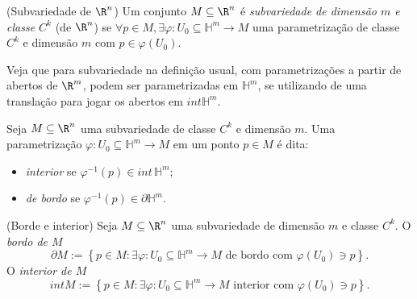 \begin{definition}
    (Subvariedade de $\R^{n}$) Um conjunto $M\subseteq\R^{n}$ é \emph{subvariedade de dimensão $m$ e classe $C^{k}$} (de $\R^{n}$) se $\forall p\in M, \exists \varphi : U_0\subseteq\mathbb{H}^{m} \longrightarrow M$ uma parametrização de classe $C^{k}$ e dimensão $m$ com $p\in \varphi \left( U_0 \right) $.
\end{definition}

Veja que para subvariedade na definição usual, com parametrizações a partir de abertos de $\R^{m}$, podem ser parametrizadas em $\mathbb{H}^{m}$, se utilizando de uma translação para jogar os abertos em $int \mathbb{H}^{m}$.

\begin{definition}
    Seja $M\subseteq\R^{n}$ uma subvariedade de classe $C^{k}$ e dimensão $m$. Uma parametrização $\varphi : U_0\subseteq\mathbb{H}^{m} \longrightarrow M$ em um ponto $p \in M$ é dita:
    \begin{itemize}
        \item \emph{interior} se $\varphi ^{-1}\left( p \right) \in  int \, \mathbb{H}^{m}$;
	\item \emph{de bordo} se $\varphi ^{-1}\left( p \right) \in \partial \mathbb{H}^{m}$.
    \end{itemize}
\end{definition}

\begin{definition}
    (Borde e interior) Seja $M\subseteq\R^{n}$ uma subvariedade de dimensão $m$ e classe $C^{k}$. O \emph{bordo de $M$} \[
    \partial M := \left\{ p\in M: \exists \varphi : U_0\subseteq\mathbb{H}^{m} \longrightarrow M \text{ de bordo com }\varphi \left( U_0 \right) \ni p \right\} 
    .\] O \emph{interior de $M$} \[
    int M := \left\{ p \in M : \exists \varphi : U_0\subseteq\mathbb{H}^{m} \longrightarrow M \text{ interior com } \varphi \left( U_0 \right) \ni p\right\} 
    .\] 
\end{definition}

